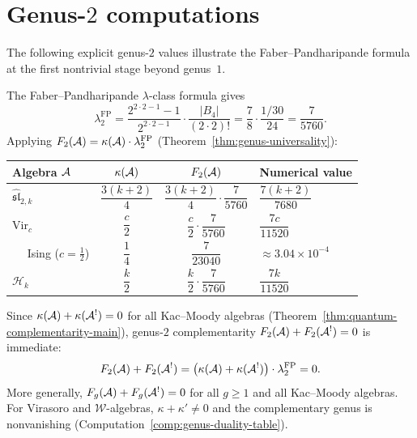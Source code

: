 \section{Genus-\texorpdfstring{$2$}{2} computations}
\label{sec:genus-2-computations}

The following explicit genus-$2$ values illustrate the Faber--Pandharipande formula at the first
nontrivial stage beyond genus~$1$.

\begin{computation}\label{comp:genus-2-values}
The Faber--Pandharipande $\lambda$-class formula gives
\begin{equation}\label{eq:lambda-2-value}
\lambda_2^{\mathrm{FP}}
  = \frac{2^{2 \cdot 2 - 1} - 1}{2^{2 \cdot 2 - 1}}
    \cdot \frac{|B_4|}{(2 \cdot 2)!}
  = \frac{7}{8} \cdot \frac{1/30}{24}
  = \frac{7}{5760}.
\end{equation}
Applying $F_2(\mathcal{A}) = \kappa(\mathcal{A}) \cdot \lambda_2^{\mathrm{FP}}$
\textup{(}Theorem~\textup{\ref{thm:genus-universality})}:
\begin{center}
\renewcommand{\arraystretch}{1.2}
\begin{tabular}{lccl}
\toprule
Algebra $\mathcal{A}$ & $\kappa(\mathcal{A})$ & $F_2(\mathcal{A})$ & Numerical value \\
\midrule
$\widehat{\mathfrak{sl}}_{2,k}$
  & $\dfrac{3(k+2)}{4}$
  & $\dfrac{3(k+2)}{4} \cdot \dfrac{7}{5760}$
  & $\dfrac{7(k+2)}{7680}$ \\[6pt]
$\mathrm{Vir}_c$
  & $\dfrac{c}{2}$
  & $\dfrac{c}{2} \cdot \dfrac{7}{5760}$
  & $\dfrac{7c}{11520}$ \\[6pt]
$\quad$ Ising ($c = \tfrac{1}{2}$)
  & $\dfrac{1}{4}$
  & $\dfrac{7}{23040}$
  & $\approx 3.04 \times 10^{-4}$ \\[6pt]
$\mathcal{H}_k$
  & $\dfrac{k}{2}$
  & $\dfrac{k}{2} \cdot \dfrac{7}{5760}$
  & $\dfrac{7k}{11520}$ \\
\bottomrule
\end{tabular}
\end{center}
\end{computation}

\begin{remark}
\label{rem:genus-2-complementarity}
Since $\kappa(\mathcal{A}) + \kappa(\mathcal{A}^!) = 0$ for all Kac--Moody algebras
\textup{(}Theorem~\textup{\ref{thm:quantum-complementarity-main})},
genus-$2$ complementarity $F_2(\mathcal{A}) + F_2(\mathcal{A}^!) = 0$ is immediate:
\[
F_2(\mathcal{A}) + F_2(\mathcal{A}^!)
  = \bigl(\kappa(\mathcal{A}) + \kappa(\mathcal{A}^!)\bigr) \cdot \lambda_2^{\mathrm{FP}}
  = 0.
\]
More generally, $F_g(\mathcal{A}) + F_g(\mathcal{A}^!) = 0$ for all $g \geq 1$
and all Kac--Moody algebras.  For Virasoro and $\mathcal{W}$-algebras,
$\kappa + \kappa' \neq 0$ and the complementary genus is nonvanishing
\textup{(}Computation~\textup{\ref{comp:genus-duality-table})}.
\end{remark}

